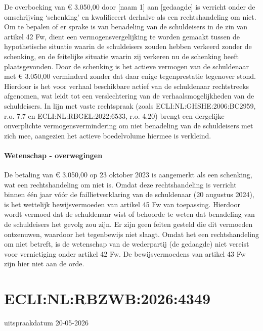 \documentclass[
  dutch,
  a4paper,
]{article}
\begin{document}
De overboeking van € 3.050,00 door {[}naam 1{]} aan {[}gedaagde{]} is verricht onder de omschrijving `schenking' en kwalificeert derhalve als een rechtshandeling om niet. Om te bepalen of er sprake is van benadeling van de schuldeisers in de zin van artikel 42 Fw, dient een vermogensvergelijking te worden gemaakt tussen de hypothetische situatie waarin de schuldeisers zouden hebben verkeerd zonder de schenking, en de feitelijke situatie waarin zij verkeren nu de schenking heeft plaatsgevonden. Door de schenking is het actieve vermogen van de schuldenaar met € 3.050,00 verminderd zonder dat daar enige tegenprestatie tegenover stond. Hierdoor is het voor verhaal beschikbare actief van de schuldenaar rechtstreeks afgenomen, wat leidt tot een verslechtering van de verhaalsmogelijkheden van de schuldeisers. In lijn met vaste rechtspraak (zoals ECLI:NL:GHSHE:2006:BC2959, r.o. 7.7 en ECLI:NL:RBGEL:2022:6533, r.o. 4.20) brengt een dergelijke onverplichte vermogensvermindering om niet benadeling van de schuldeisers met zich mee, aangezien het actieve boedelvolume hiermee is verkleind.

\paragraph{Wetenschap - overwegingen}\label{wetenschap---overwegingen-35}

De betaling van € 3.050,00 op 23 oktober 2023 is aangemerkt als een schenking, wat een rechtshandeling om niet is. Omdat deze rechtshandeling is verricht binnen één jaar vóór de faillietverklaring van de schuldenaar (20 augustus 2024), is het wettelijk bewijsvermoeden van artikel 45 Fw van toepassing. Hierdoor wordt vermoed dat de schuldenaar wist of behoorde te weten dat benadeling van de schuldeisers het gevolg zou zijn. Er zijn geen feiten gesteld die dit vermoeden ontzenuwen, waardoor het tegenbewijs niet slaagt. Omdat het een rechtshandeling om niet betreft, is de wetenschap van de wederpartij (de gedaagde) niet vereist voor vernietiging onder artikel 42 Fw. De bewijsvermoedens van artikel 43 Fw zijn hier niet aan de orde.

\newpage


\section{ECLI:NL:RBZWB:2026:4349}\label{eclinlrbzwb20264349}

uitspraakdatum 20-05-2026
\end{document}
